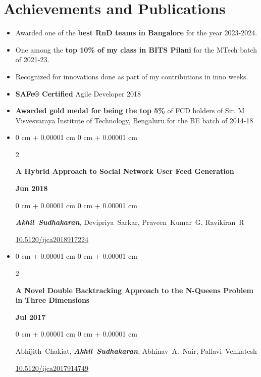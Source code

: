 \documentclass[10pt, letterpaper]{article}
\newenvironment{highlights}{
    \begin{itemize}[
        topsep=0.10 cm,
        parsep=0.10 cm,
        partopsep=0pt,
        itemsep=0pt,
        leftmargin=0 cm + 10pt
    ]
}{
    \end{itemize}
} %
\newenvironment{onecolentry}{
    \begin{adjustwidth}{
        0 cm + 0.00001 cm
    }{
        0 cm + 0.00001 cm
    }
}{
    \end{adjustwidth}
} %
\newenvironment{twocolentry}[2][]{
    \onecolentry
    \def\secondColumn{#2}
    \setcolumnwidth{\fill, 4.5 cm}
    \begin{paracol}{2}
}{
    \switchcolumn \raggedleft \secondColumn
    \end{paracol}
    \endonecolentry
} %
\begin{document}
    \section{Achievements and Publications}
        \begin{highlights}        
        \item Awarded one of the \textbf{best RnD teams in Bangalore} for the year 2023-2024.
        \item One among the \textbf{top 10\% of my class in BITS Pilani} for the MTech batch of 2021-23.
        \item Recognized for innovations done as part of my contributions in inno weeks.
        \item \textbf{SAFe® Certified} Agile Developer 2018
        \item \textbf{Awarded gold medal for being the top 5\%} of FCD holders of Sir. M Visvesvaraya Institute of Technology, Bengaluru for the BE batch of 2014-18
        \item \begin{samepage}
            \begin{twocolentry}{
                \textbf{Jun 2018}
            }
                \textbf{A Hybrid Approach to Social Network User Feed Generation}
            \end{twocolentry}

            \vspace{0.10 cm}
            
            \begin{onecolentry}
                \mbox{\textbf{\textit{Akhil Sudhakaran}}}, \mbox{Devipriya Sarkar}, \mbox{Praveen Kumar G}, \mbox{Ravikiran R}

                \vspace{0.10 cm}
                
        \href{https://doi.org/10.5120/ijca2018917224}{10.5120/ijca2018917224}
        \end{onecolentry}
        \end{samepage}
        \item \begin{samepage}
            \begin{twocolentry}{
                \textbf{Jul 2017}
            }
                \textbf{A Novel Double Backtracking Approach to the
 N-Queens Problem in Three Dimensions}
            \end{twocolentry}

            \vspace{0.10 cm}
            
            \begin{onecolentry}
                \mbox{Abhijith Chakiat}, \mbox{\textbf{\textit{Akhil Sudhakaran}}}, \mbox{Abhinav A. Nair}, \mbox{Pallavi Venkatesh}

                \vspace{0.10 cm}
                
        \href{https://doi.org/10.5120/ijca2017914749}{10.5120/ijca2017914749}
        \end{onecolentry}
        \end{samepage}
        \end{highlights}
\end{document}
